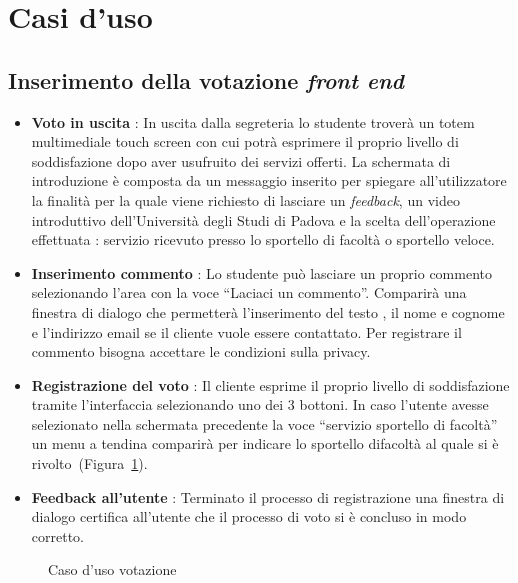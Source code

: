 \newpage
\section{Casi d'uso}
\subsection{Inserimento della votazione \emph{front end}}
\begin{itemize}
  \item \textbf{Voto in uscita} : In uscita dalla segreteria lo studente
  troverà un totem multimediale touch screen con cui potrà esprimere il
  proprio livello di soddisfazione dopo aver usufruito dei servizi offerti. La
  schermata di introduzione è composta da un messaggio inserito per spiegare
  all'utilizzatore la finalità per la quale viene richiesto di lasciare un
  \emph{feedback}, un video introduttivo dell'Università degli Studi di Padova
  e la scelta dell'operazione effettuata : servizio ricevuto presso lo sportello
  di facoltà o sportello veloce.
  \item \textbf{Inserimento commento} : Lo studente può lasciare un proprio
  commento selezionando l'area con la voce ``Laciaci un commento''. Comparirà
  una finestra di dialogo che permetterà l'inserimento del testo , il nome e
  cognome e l'indirizzo email se il cliente vuole essere contattato. Per
  registrare il commento bisogna accettare le condizioni sulla
  privacy.
  \item \textbf{Registrazione del voto} : Il cliente esprime il proprio livello
  di soddisfazione tramite l’interfaccia selezionando uno dei 3 bottoni. In caso
  l'utente avesse selezionato nella schermata precedente la voce ``servizio
  sportello di facoltà'' un menu a tendina comparirà per indicare lo sportello
  difacoltà al quale si è rivolto~(Figura~\ref{fig:usecase-voting}).
  \item \textbf{Feedback all'utente} : Terminato il processo di registrazione
  una finestra di dialogo certifica all'utente che il processo di voto si è
  concluso in modo corretto.
\end{itemize}

\begin{figure}[!h]
  \centering
  \caption{Caso d'uso votazione}
  \label{fig:usecase-voting}
\end{figure}

